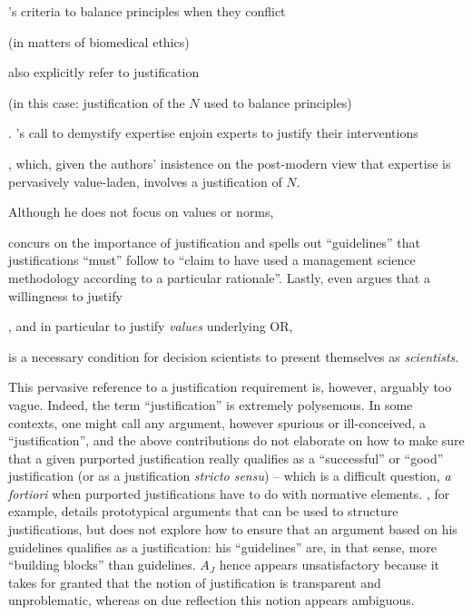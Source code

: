 \documentclass[preprint, french, english, 11pt, authoryear]{elsarticle}%
\newcommand{\possessivecite}[1]{\citeauthor{#1}’s \citeyearpar{#1}}
\begin{document}
 \possessivecite{beauchamp_principles_2009} criteria to balance principles when they conflict \begin{changebar}(in matters of biomedical ethics)\end{changebar} also explicitly refer to justification \begin{changebar}(in this case: justification of the $N$ used to balance principles)\end{changebar}.
\possessivecite{white_death_1994} call to demystify expertise enjoin experts to justify their interventions\begin{changebar}, which, given the authors' insistence on the post-modern view that expertise is pervasively value-laden, involves a justification of $N$.\end{changebar}
\begin{changebar}Although he does not focus on values or norms,\end{changebar} \citet{jackson_towards_1999} concurs on the importance of justification and spells out ``guidelines'' that justifications ``must'' follow to “claim to have used a management science methodology according to a particular rationale''.
Lastly, \citet{ormerod_justifying_2010} even argues that a willingness to justify\begin{changebar}, and in particular to justify \emph{values} underlying OR,\end{changebar} is a necessary condition for decision scientists to present themselves as \emph{scientists}.

 
This pervasive reference to a justification requirement is, however, arguably too vague. Indeed, the term ``justification'' is extremely polysemous. 
In some contexts, one might call any argument, however spurious or ill-conceived, a ``justification'', and the above contributions do not elaborate on how to make sure that a given purported justification really qualifies as a ``successful'' or ``good'' justification (or as a justification \emph{stricto sensu}) -- which is a difficult question, \emph{a fortiori} when purported justifications have to do with normative elements.
\citet{jackson_towards_1999}, for example, details prototypical arguments that can be used to structure justifications, but does not explore how to ensure that an argument based on his guidelines qualifies as a justification: his ``guidelines'' are, in that sense, more ``building blocks'' than guidelines. 
$A_J$ hence appears unsatisfactory because it takes for granted that the notion of justification is transparent and unproblematic, whereas on due reflection this notion appears ambiguous.
\end{document}
